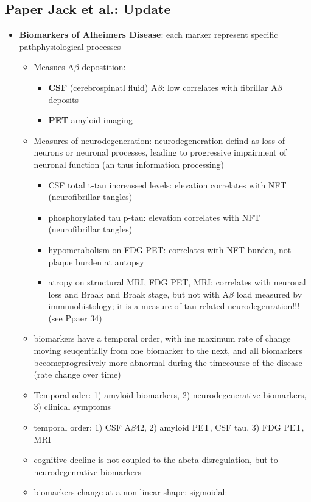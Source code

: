 \documentclass[fleqn]{article}\usepackage{caption}
\begin{document}
\subsection{Paper Jack et al.: Update}
\begin{itemize}
\item \textbf{Biomarkers of Alheimers Disease}:  each marker represent specific pathphysiological processes
\begin{itemize}
\item Measues A$\beta$ depostition:
\begin{itemize}
\item \textbf{CSF} (cerebrospinatl fluid) A$\beta$: low correlates with fibrillar A$\beta$ deposits
\item \textbf{PET} amyloid imaging
\end{itemize} 
\item Measures of neurodegeneration: neurodegeneration defind as loss of neurons or  neuronal processes,  leading to progressive impairment of neuronal function (an thus information processing)
\begin{itemize}
\item CSF total t-tau increassed levels: elevation correlates with NFT (neurofibrillar tangles)
\item phosphorylated tau p-tau: elevation correlates with NFT (neurofibrillar tangles)
\item hypometabolism on FDG PET: correlates with NFT burden, not plaque burden at autopsy
\item atropy on structural MRI, FDG PET, MRI: correlates with neuronal loss and Braak and Braak stage, but not with A$\beta$ load measured by immunohistology; it is a measure of tau related neurodegenration!!! (see Ppaer 34)
\end{itemize}
\item biomarkers have a temporal order, with ine maximum rate of change moving seuqentially from one biomarker to the next, and all biomarkers becomeprogresively more abnormal during the timecourse of the disease (rate change over time)
\item Temporal oder: 1) amyloid biomarkers, 2) neurodegenerative biomarkers, 3) clinical symptoms
\item temporal order: 1) CSF A$\beta$42, 2) amyloid PET, CSF tau, 3) FDG PET, MRI
\item cognitive decline is not coupled to the abeta disregulation, but to neurodegenrative biomarkers
\item biomarkers change at a non-linear shape: sigmoidal:

\end{itemize}
\end{itemize}
\end{document}
